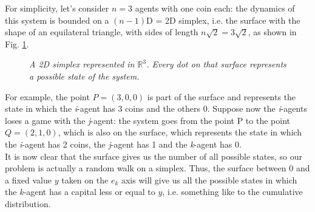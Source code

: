 For simplicity, let's consider $n = 3$ agents with one coin each: the dynamics of this system  is bounded on a $\left(n-1\right)$D = 2D simplex, i.e. the surface with the shape of an equilateral triangle, with sides of length $n\sqrt{2}=3\sqrt{2}$, as shown in Fig. \ref{fig:threeSimplex}.
\begin{figure}[H]
    \centering
    \caption{\emph{A 2D simplex represented in $\mathbb{R}^3$. Every dot on that surface represents a possible state of the system.}}
    \label{fig:threeSimplex}
\end{figure}
For example, the point $P = (3, 0, 0)$ is part of the surface and represents the state in which the \emph{i}-agent has 3 coins and the others 0.
Suppose now the \emph{i}-agents loses a game with the \emph{j}-agent: the system goes from the point P to the point $Q = (2, 1, 0)$, which is also on the surface, which represents the state in which the \emph{i}-agent has 2 coins, the \emph{j}-agent has 1 and the \emph{k}-agent has 0.
\\It is now clear that the surface gives us the number of all possible states, so our problem is actually a random walk on a simplex.
Thus, the surface between 0 and a fixed value $y$ taken on the $e_k$ axis will give us all the possible states in which the \emph{k}-agent has a capital less or equal to $y$, i.e. something like to the cumulative distribution.

